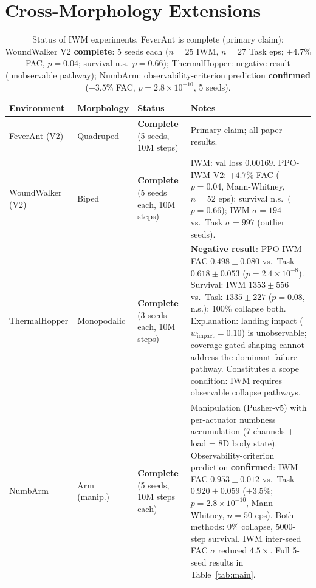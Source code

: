\documentclass{article}
\begin{document}
{\section{Cross-Morphology Extensions}
\label{app:planned_extensions}
\begin{table}[H]
\centering
\caption{Status of IWM experiments.  FeverAnt is complete (primary claim);
WoundWalker V2 \textbf{complete}: 5 seeds each ($n\!=\!25$ IWM, $n\!=\!27$ Task eps; $+4.7\%$ FAC, $p\!=\!0.04$; survival n.s.\ $p\!=\!0.66$); ThermalHopper: negative result (unobservable pathway); NumbArm: observability-criterion prediction \textbf{confirmed} ($+3.5\%$ FAC, $p\!=\!2.8{\times}10^{-10}$, 5 seeds).}
\small
\setlength{\tabcolsep}{4pt}
\begin{tabular}{llp{2.8cm}p{5.4cm}}
\toprule
Environment & Morphology & Status & Notes \\
\midrule
FeverAnt (V2) & Quadruped & \textbf{Complete} (5 seeds, 10M steps) &
  Primary claim; all paper results. \\
WoundWalker (V2) & Biped & \textbf{Complete} (5 seeds each, 10M steps) &
  IWM: val loss $0.00169$.  PPO-IWM-V2: $+4.7\%$ FAC ($p\!=\!0.04$, Mann-Whitney, $n\!=\!52$ eps);
  survival n.s.\ ($p\!=\!0.66$); IWM $\sigma\!=\!194$ vs.\ Task $\sigma\!=\!997$ (outlier seeds). \\
ThermalHopper & Monopodalic & \textbf{Complete} (3 seeds each, 10M steps) &
  \textbf{Negative result}: PPO-IWM FAC $0.498\pm0.080$ vs.\ Task $0.618\pm0.053$ ($p\!=\!2.4{\times}10^{-8}$).
  Survival: IWM $1353\pm556$ vs.\ Task $1335\pm227$ ($p\!=\!0.08$, n.s.); 100\% collapse both.
  Explanation: landing impact ($w_\mathrm{impact}\!=\!0.10$) is unobservable; coverage-gated shaping
  cannot address the dominant failure pathway.
  Constitutes a scope condition: IWM requires observable collapse pathways. \\
NumbArm & Arm (manip.) & \textbf{Complete} (5 seeds, 10M steps each) &
  Manipulation (Pusher-v5) with per-actuator numbness accumulation (7 channels + load = 8D body state).
  Observability-criterion prediction \textbf{confirmed}: IWM FAC $0.953\pm0.012$ vs.\ Task $0.920\pm0.059$ ($+3.5\%$; $p\!=\!2.8{\times}10^{-10}$, Mann-Whitney, $n\!=\!50$ eps).
  Both methods: 0\% collapse, 5000-step survival. IWM inter-seed FAC $\sigma$ reduced $4.5\times$.
  Full 5-seed results in Table~\ref{tab:main}. \\
\bottomrule
\end{tabular}
\end{table}

}
\end{document}
